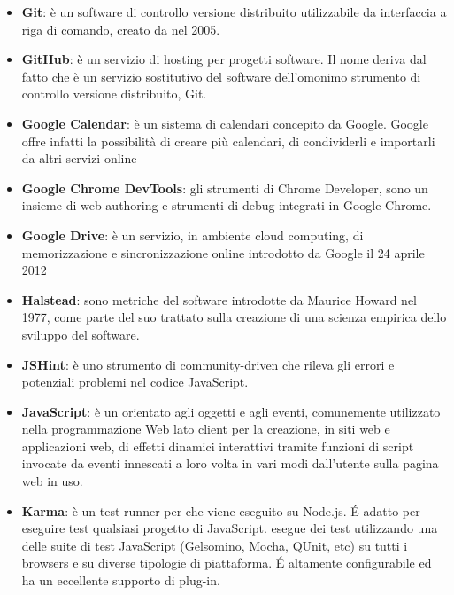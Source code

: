 \begin{itemize}
\item[] \textbf{Git}: è un software di controllo versione distribuito utilizzabile da interfaccia a riga di comando, creato da  nel 2005.
\item[] \textbf{GitHub}: è un servizio di hosting per progetti software. Il nome deriva dal fatto che  è un servizio sostitutivo del software dell'omonimo strumento di controllo versione distribuito, Git.
\item[] \textbf{Google Calendar}: è un sistema di calendari concepito da Google. Google offre infatti la possibilità di creare più calendari, di condividerli e importarli da altri servizi online
\item[] \textbf{Google Chrome DevTools}: gli strumenti di Chrome Developer, sono un insieme di web authoring e strumenti di debug integrati in Google Chrome.
\item[] \textbf{Google Drive}: è un servizio, in ambiente cloud computing, di memorizzazione e sincronizzazione online introdotto da Google il 24 aprile 2012
\end{itemize}
\newpage

\begin{itemize}
\item[] \textbf{Halstead}: sono metriche del software introdotte da Maurice Howard  nel 1977, come parte del suo trattato sulla creazione di una scienza empirica dello sviluppo del software.
\end{itemize}
\newpage

\begin{itemize}
\item[] \textbf{JSHint}: è uno strumento di community-driven che rileva gli errori e potenziali problemi nel codice JavaScript.
\item[] \textbf{JavaScript}: è un  orientato agli oggetti e agli eventi, comunemente utilizzato nella programmazione Web lato client per la creazione, in siti web e applicazioni web, di effetti dinamici interattivi tramite funzioni di script invocate da eventi innescati a loro volta in vari modi dall'utente sulla pagina web in uso.
\end{itemize}
\newpage

\begin{itemize}
\item[] \textbf{Karma}: è un test runner per  che viene eseguito su Node.js. \'E adatto per eseguire test qualsiasi progetto di JavaScript.  esegue dei test utilizzando una delle suite di test JavaScript (Gelsomino, Mocha, QUnit, etc) su tutti i browsers e su diverse tipologie di piattaforma. \'E altamente configurabile ed ha un eccellente supporto di plug-in.
\end{itemize}
\newpage

